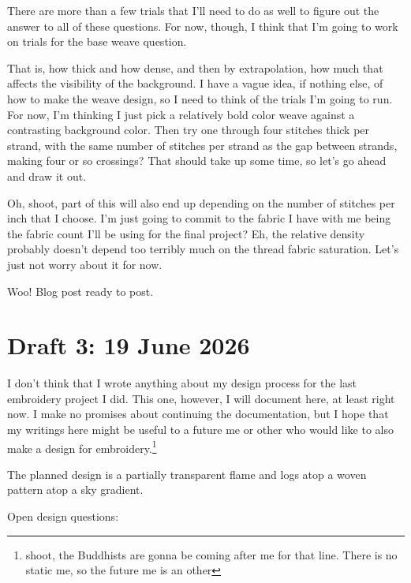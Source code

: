 \documentclass[12pt]{article}
\renewcommand{\,}{\textsuperscript{,}}
\begin{document}
There are more than a few trials that I'll need to do as well to figure out the answer to all of these questions.  
For now, though, I think that I'm going to work on trials for the base weave question.

That is, how thick and how dense, and then by extrapolation, how much that affects the visibility of the background.  
I have a vague idea, if nothing else, of how to make the weave design, so I need to think of the trials I'm going to run.  
For now, I'm thinking I just pick a relatively bold color weave against a contrasting background color.  
Then try one through four stitches thick per strand, with the same number of stitches per strand as the gap between strands, making four or so crossings?  
That should take up some time, so let's go ahead and draw it out.

Oh, shoot, part of this will also end up depending on the number of stitches per inch that I choose. I'm just going to commit to the fabric I have with me being the fabric count I'll be using for the final project?  
Eh, the relative density probably doesn't depend too terribly much on the thread fabric saturation.  
Let's just not worry about it for now.

Woo! Blog post ready to post.

\section{Draft 3: 19 June 2026}

I don't think that I wrote anything about my design process for the last embroidery project I did.  
This one, however, I will document here, at least right now.  
I make no promises about continuing the documentation, but I hope that my writings here might be useful to a future me or other who would like to also make a design for embroidery.\footnote{shoot, the Buddhists are gonna be coming after me for that line. There is no static me, so the future me is an other}

The planned design is a partially transparent flame and logs atop a woven pattern atop a sky gradient.

Open design questions:
\end{document}
